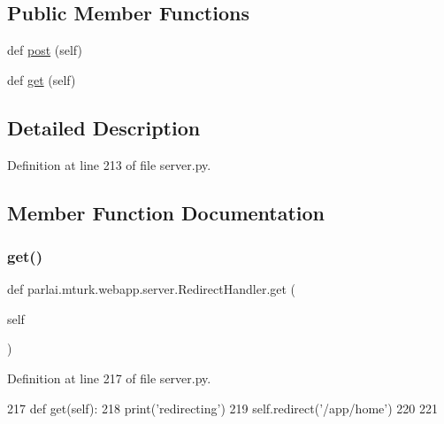 \subsection*{Public Member Functions}
\begin{DoxyCompactItemize}
\item 
def \hyperlink{classparlai_1_1mturk_1_1webapp_1_1server_1_1RedirectHandler_a1b5e6edf88df4e60433ec3a8244773b6}{post} (self)
\item 
def \hyperlink{classparlai_1_1mturk_1_1webapp_1_1server_1_1RedirectHandler_a8257f43e09aae52e61eae8357db5b6ad}{get} (self)
\end{DoxyCompactItemize}


\subsection{Detailed Description}


Definition at line 213 of file server.\+py.



\subsection{Member Function Documentation}
\mbox{\label{classparlai_1_1mturk_1_1webapp_1_1server_1_1RedirectHandler_a8257f43e09aae52e61eae8357db5b6ad}} 
\subsubsection{\texorpdfstring{get()}{get()}}
{\footnotesize\ttfamily def parlai.\+mturk.\+webapp.\+server.\+Redirect\+Handler.\+get (\begin{DoxyParamCaption}\item[{}]{self }\end{DoxyParamCaption})}



Definition at line 217 of file server.\+py.


\begin{DoxyCode}
217     \textcolor{keyword}{def }get(self):
218         print(\textcolor{stringliteral}{'redirecting'})
219         self.redirect(\textcolor{stringliteral}{'/app/home'})
220 
221 
\end{DoxyCode}
\mbox{\label{classparlai_1_1mturk_1_1webapp_1_1server_1_1RedirectHandler_a1b5e6edf88df4e60433ec3a8244773b6}} 
